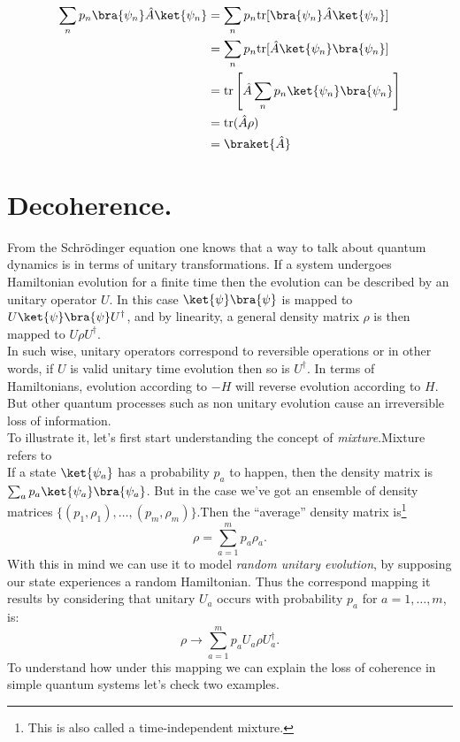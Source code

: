 \begin{appendix}
\begin{align}
\sum_{n}p_n\bra{\psi_n}\hat{A}\ket{\psi_n}&=\sum_n p_n \text{tr}[\bra{\psi_n}\hat{A}\ket{\psi_n}] \nonumber \\
&=\sum_n p_n\text{tr}[\hat{A}\ket{\psi_n}\bra{\psi_n}] \nonumber \\
&=\text{tr}\left[\hat{A}\sum_n p_n\ket{\psi_n}\bra{\psi_n}\right]\nonumber\\
&=\text{tr}(\hat{A}\rho) \nonumber \\
&=\braket{\hat{A}} 
\label{appendixexpectedvalue}
\end{align} 

\section{Decoherence.}\label{appendixAdecoherence}
From the Schr{\"o}dinger equation one knows that a way to talk about quantum dynamics is in terms of unitary transformations. If a system undergoes Hamiltonian evolution for a finite time then the evolution can be described by an unitary operator $U$. In this case $\ket{\psi}\bra{\psi}$ is mapped to $U\ket{\psi}\bra{\psi}U^{\dagger}$, and by linearity, a general density matrix $\rho$ is then mapped to $U\rho U^{\dagger}$.\\
In such wise, unitary operators correspond to reversible operations or in other words, if $U$ is valid unitary time evolution then so is $U^{\dagger}$. In terms of Hamiltonians, evolution according to $-H$ will reverse evolution according to $H$. But other quantum processes such as non unitary evolution cause an irreversible loss of information.\\
To illustrate it, let's first start understanding the concept of \textit{mixture}.Mixture refers to \\

If a state $\ket{\psi_{a}}$ has a probability $p_a$ to happen, then the density matrix is $\sum_{a}p_{a}\ket{\psi_{a}}\bra{\psi_{a}}$. But in the case we've got an ensemble of density matrices $\{(p_1,\rho_1),\ldots,(p_m,\rho_m)\}$.Then the ``average'' density matrix is\footnote{This is also called a time-independent mixture.}
\begin{equation}
\rho=\sum^{m}_{a=1}p_a\rho_a.
\label{rhoapendixA}
\end{equation}
With this in mind we can use it to model \textit{random unitary evolution}, by supposing our state experiences a random Hamiltonian. Thus the correspond mapping it results by considering that unitary $U_{a}$ occurs with probability $p_a$ for $a=1,\ldots,m$, is:
\begin{equation}
\rho\longrightarrow \sum_{a=1}^{m}p_a U_a \rho U_{a}^{\dagger}.
\label{Mapping}
\end{equation}
To understand how under this mapping we can explain the loss of coherence in simple quantum systems let's check two examples.

\end{appendix}
